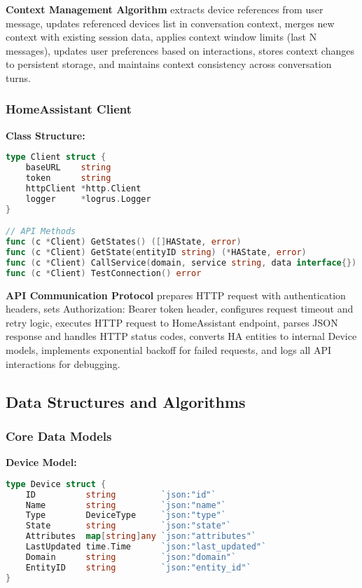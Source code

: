 \documentclass[12pt]{article}
\begin{document}
\textbf{Context Management Algorithm} extracts device references from user message, updates referenced devices list in conversation context, merges new context with existing session data, applies context window limits (last N messages), updates user preferences based on interactions, stores context changes to persistent storage, and maintains context consistency across conversation turns.

\subsubsection{HomeAssistant Client}

\textbf{Class Structure:}
\begin{lstlisting}[language=Go, caption=HomeAssistant Client Structure]
type Client struct {
    baseURL    string
    token      string
    httpClient *http.Client
    logger     *logrus.Logger
}

// API Methods
func (c *Client) GetStates() ([]HAState, error)
func (c *Client) GetState(entityID string) (*HAState, error)
func (c *Client) CallService(domain, service string, data interface{}) error
func (c *Client) TestConnection() error
\end{lstlisting}

\textbf{API Communication Protocol} prepares HTTP request with authentication headers, sets Authorization: Bearer {token} header, configures request timeout and retry logic, executes HTTP request to HomeAssistant endpoint, parses JSON response and handles HTTP status codes, converts HA entities to internal Device models, implements exponential backoff for failed requests, and logs all API interactions for debugging.

\subsection{Data Structures and Algorithms}

\subsubsection{Core Data Models}

\textbf{Device Model:}
\begin{lstlisting}[language=Go, caption=Device Data Structure]
type Device struct {
    ID          string         `json:"id"`
    Name        string         `json:"name"`
    Type        DeviceType     `json:"type"`
    State       string         `json:"state"`
    Attributes  map[string]any `json:"attributes"`
    LastUpdated time.Time      `json:"last_updated"`
    Domain      string         `json:"domain"`
    EntityID    string         `json:"entity_id"`
}
\end{lstlisting}
\end{document}
